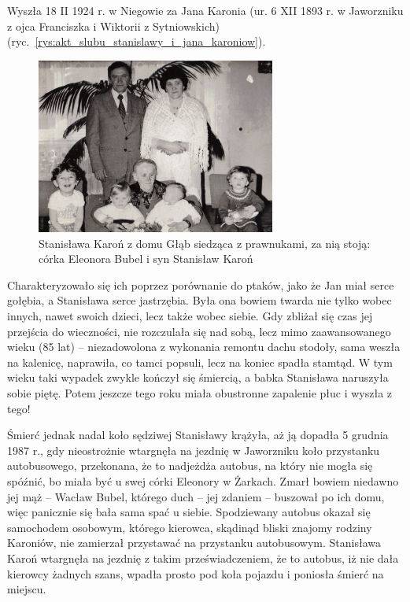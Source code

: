Wyszła 18 II 1924 r. w Niegowie za Jana Karonia (ur. 6 XII 1893 r. w Jaworzniku z ojca Franciszka i Wiktorii z Sytniowskich) (ryc.~\ref{rys:akt_slubu_stanislawy_i_jana_karoniow}).

\begin{figure}
\begin{center}
\includegraphics[width=0.7\textwidth]{zdjecia/statnislawa_karon_1.jpg}
\caption[Stanisława Karoń z rodziną]{Stanisława Karoń z domu Głąb siedząca z prawnukami, za nią stoją: córka Eleonora Bubel i syn Stanisław Karoń}
\label{rys:statnislawa_karon_1}
\end{center}
\end{figure}

Charakteryzowało się ich poprzez porównanie do ptaków, jako że Jan miał serce gołębia, a Stanisława serce jastrzębia. Była ona bowiem twarda nie tylko wobec innych, nawet swoich dzieci, lecz także wobec siebie. Gdy zbliżał się czas jej przejścia do wieczności, nie rozczulała się nad sobą, lecz mimo zaawansowanego wieku (85 lat) -- niezadowolona z wykonania remontu dachu stodoły, sama weszła na kalenicę, naprawiła, co tamci popsuli, lecz na koniec spadła stamtąd. W tym wieku taki wypadek zwykle kończył się śmiercią, a babka Stanisława naruszyła sobie piętę. Potem jeszcze tego roku miała obustronne zapalenie płuc i wyszła z tego!

Śmierć jednak nadal koło sędziwej Stanisławy krążyła, aż ją dopadła 5 grudnia 1987 r., gdy nieostrożnie wtargnęła na jezdnię w Jaworzniku koło przystanku autobusowego, przekonana, że to nadjeżdża autobus, na który nie mogła się spóźnić, bo miała być u swej córki Eleonory w Żarkach. Zmarł bowiem niedawno jej mąż -- Wacław Bubel, którego duch -- jej zdaniem -- buszował po ich domu, więc panicznie się bała sama spać u siebie. Spodziewany autobus okazał się samochodem osobowym, którego kierowca, skądinąd  bliski znajomy rodziny Karoniów, nie zamierzał przystawać na przystanku autobusowym. Stanisława Karoń wtargnęła na jezdnię z takim przeświadczeniem, że to autobus, iż nie dała kierowcy żadnych szans, wpadła prosto pod koła pojazdu i poniosła śmierć na miejscu.


